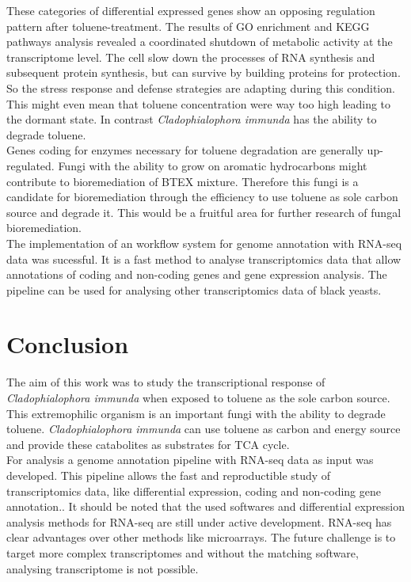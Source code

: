 \documentclass[12pt, a4paper]{report}
\begin{document}
These categories of differential expressed genes show an opposing regulation pattern after toluene-treatment. The results of GO enrichment and KEGG pathways analysis revealed a coordinated shutdown of metabolic activity at the transcriptome level. The cell slow down the processes of RNA synthesis and subsequent protein synthesis, but can survive by building proteins for protection. 
So the stress response and defense strategies are adapting during this condition. This might even mean that toluene concentration were way too high leading to the dormant state. In contrast \textit{Cladophialophora immunda} has the ability to degrade toluene. \\
Genes coding for enzymes necessary for toluene degradation are generally up-regulated. Fungi with the ability to grow on aromatic hydrocarbons might contribute to bioremediation of BTEX mixture. Therefore this fungi is a candidate for bioremediation through the efficiency to use toluene as sole carbon source and degrade it. This would be a fruitful area for further research of fungal bioremediation. \\

The implementation of an workflow system for genome annotation with RNA-seq data was sucessful. It is a fast method to analyse transcriptomics data that allow annotations of coding and non-coding genes and gene expression analysis. The pipeline can be used for analysing other transcriptomics data of black yeasts. 



\newpage
\chapter*{Conclusion}
The aim of this work was to study the transcriptional response of \textit{Cladophialophora immunda} when exposed to toluene as the sole carbon source. This extremophilic organism is an important fungi with the ability to degrade toluene. \textit{Cladophialophora immunda} can use toluene as carbon and energy source  and provide these catabolites as substrates for TCA cycle. \\

For analysis a genome annotation pipeline with RNA-seq data as input was developed. This pipeline allows the fast and reproductible study of transcriptomics data, like differential expression, coding and non-coding gene annotation.. It should be noted that the used softwares and differential expression analysis methods for RNA-seq are still under active development. RNA-seq has clear advantages over other methods like microarrays. The future challenge is to target more complex transcriptomes and without the matching software, analysing transcriptome is not possible. \\
 
\end{document}
